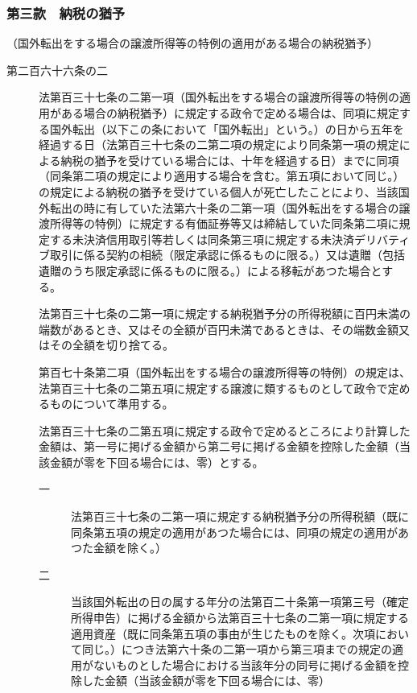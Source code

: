 \documentclass[twocolumn,a4j,10pt]{ltjtarticle}
\begin{document}
\subsubsection*{第三款　納税の猶予}
\noindent\hspace{10pt}（国外転出をする場合の譲渡所得等の特例の適用がある場合の納税猶予）
\begin{description}
\item[第二百六十六条の二]法第百三十七条の二第一項（国外転出をする場合の譲渡所得等の特例の適用がある場合の納税猶予）に規定する政令で定める場合は、同項に規定する国外転出（以下この条において「国外転出」という。）の日から五年を経過する日（法第百三十七条の二第二項の規定により同条第一項の規定による納税の猶予を受けている場合には、十年を経過する日）までに同項（同条第二項の規定により適用する場合を含む。第五項において同じ。）の規定による納税の猶予を受けている個人が死亡したことにより、当該国外転出の時に有していた法第六十条の二第一項（国外転出をする場合の譲渡所得等の特例）に規定する有価証券等又は締結していた同条第二項に規定する未決済信用取引等若しくは同条第三項に規定する未決済デリバティブ取引に係る契約の相続（限定承認に係るものに限る。）又は遺贈（包括遺贈のうち限定承認に係るものに限る。）による移転があつた場合とする。
\item[]法第百三十七条の二第一項に規定する納税猶予分の所得税額に百円未満の端数があるとき、又はその全額が百円未満であるときは、その端数金額又はその全額を切り捨てる。
\item[]第百七十条第二項（国外転出をする場合の譲渡所得等の特例）の規定は、法第百三十七条の二第五項に規定する譲渡に類するものとして政令で定めるものについて準用する。
\item[]法第百三十七条の二第五項に規定する政令で定めるところにより計算した金額は、第一号に掲げる金額から第二号に掲げる金額を控除した金額（当該金額が零を下回る場合には、零）とする。
\begin{description}
\item[一]法第百三十七条の二第一項に規定する納税猶予分の所得税額（既に同条第五項の規定の適用があつた場合には、同項の規定の適用があつた金額を除く。）
\item[二]当該国外転出の日の属する年分の法第百二十条第一項第三号（確定所得申告）に掲げる金額から法第百三十七条の二第一項に規定する適用資産（既に同条第五項の事由が生じたものを除く。次項において同じ。）につき法第六十条の二第一項から第三項までの規定の適用がないものとした場合における当該年分の同号に掲げる金額を控除した金額（当該金額が零を下回る場合には、零）

\end{description}
\end{description}
\end{document}
